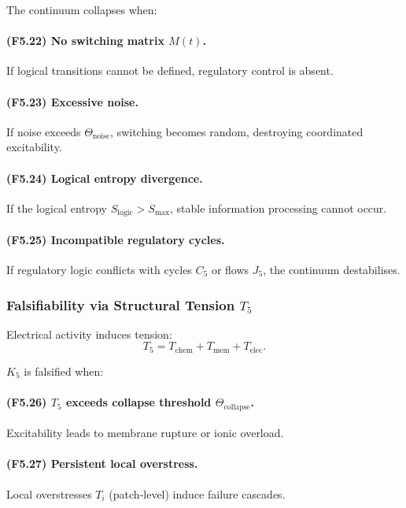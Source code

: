 The continuum collapses when:

\paragraph{(F5.22) No switching matrix \texorpdfstring{$M(t)$}{M(t)}.}
If logical transitions cannot be defined, regulatory control is absent.

\paragraph{(F5.23) Excessive noise.}
If noise exceeds $\Theta_{\mathrm{noise}}$,
switching becomes random, destroying coordinated excitability.

\paragraph{(F5.24) Logical entropy divergence.}
If the logical entropy $S_{\mathrm{logic}} > S_{\max}$,
stable information processing cannot occur.

\paragraph{(F5.25) Incompatible regulatory cycles.}
If regulatory logic conflicts with cycles $C_5$ or flows $J_5$,
the continuum destabilises.



\subsubsection{Falsifiability via Structural Tension \texorpdfstring{$T_5$}{T_5}}

Electrical activity induces tension:
\[
T_5 = T_{\mathrm{chem}} + T_{\mathrm{mem}} + T_{\mathrm{elec}}.
\]

$K_5$ is falsified when:

\paragraph{(F5.26) \texorpdfstring{$T_5$}{T_5} exceeds collapse threshold $\Theta_{\mathrm{collapse}}$.}
Excitability leads to membrane rupture or ionic overload.

\paragraph{(F5.27) Persistent local overstress.}
Local overstresses $T_i$ (patch-level) induce failure cascades.

